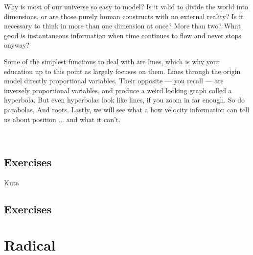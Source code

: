 

Why is most of our universe so easy to model?  
Is it valid to divide the world into dimensions,
or are those purely human constructs with no external reality?  
Is it necessary to think in more 
than one dimension at once?  More than two?  
What good is instantaneous information when 
time continues to flow and never stops anyway?

Some of the simplest functions to deal with are lines, which is why your education
up to this point as largely focuses on them.  Lines through the origin model directly
proportional variables.  Their opposite --- you recall --- are inversely proportional
variables, and produce a weird looking graph called a hyperbola.  But even hyperbolas
look like lines, if you zoom in far enough.  So do parabolas.  And roots.  Lastly,
we will see what a how velocity information can tell us about position ...
and what it can't.

\newpage
\chapterminitoc


\newpage
{}
\newpage

\newpage




\newpage
{}
\newpage

~\vfill
\newpage
\subsection{Exercises}
Kuta





\newpage
{}
\newpage

\subsection{Exercises}
\noindent{}
\newpage
\noindent{}
\newpage
\noindent{}




\newpage
\section{Radical}
